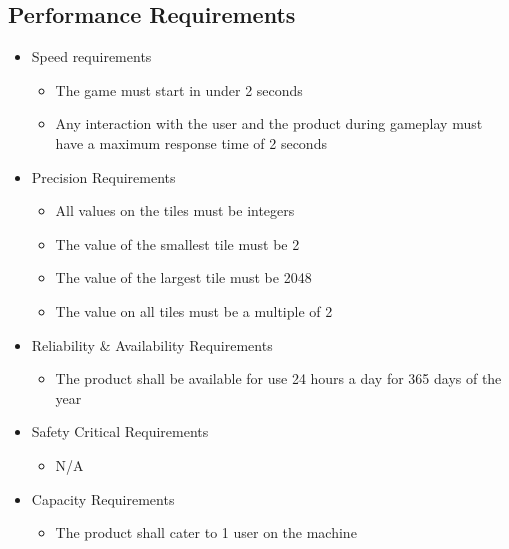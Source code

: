 \documentclass[12pt]{article}
\begin{document}
\subsection{Performance Requirements}
\begin{itemize}
\item Speed requirements
\begin{itemize}
\item The game must start in under 2 seconds
\item Any interaction with the user and the product during gameplay must have a maximum response time of 2 seconds
\end{itemize}

\item{Precision Requirements}
\begin{itemize}
\item All values on the tiles must be integers
\item The value of the smallest tile must be 2
\item The value of the largest tile must be 2048
\item The value on all tiles must be a multiple of 2
\end{itemize}

\item{Reliability \& Availability Requirements}
\begin{itemize}
\item The product shall be available for use 24 hours a day for 365 days of the year
\end{itemize}
\item{Safety Critical Requirements}
\begin{itemize}
\item N/A
\end{itemize}
\item{Capacity Requirements}
\begin{itemize}
\item The product shall cater to 1 user on the machine
\end{itemize}
\end{itemize}
\end{document}

